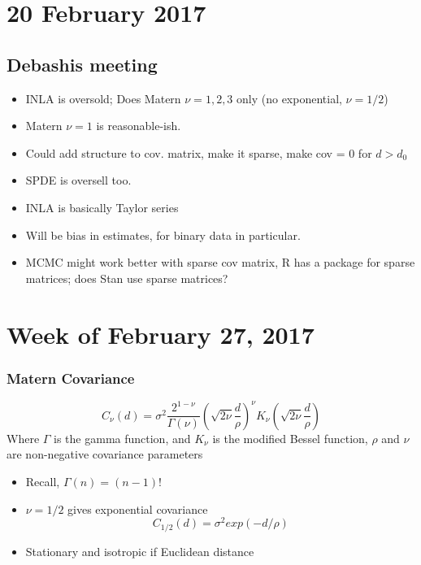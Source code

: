 \documentclass{article}
\begin{document}
\section*{20 February 2017}

\subsection*{Debashis meeting}
\begin{itemize}
\item INLA is oversold; Does Matern $\nu = 1, 2, 3$ only (no exponential, $\nu = 1/2$)
\item Matern $\nu = 1$ is reasonable-ish.
\item Could add structure to cov. matrix, make it sparse, make cov = 0 for $d > d_{0}$
\item SPDE is oversell too.
\item INLA is basically Taylor series
\item Will be bias in estimates, for binary data in particular.
\item MCMC might work better with sparse cov matrix, R has a package for sparse matrices; does Stan use sparse matrices?
\end{itemize}

\section*{Week of February 27, 2017}

\subsubsection*{Matern Covariance}
$$ C_{\nu}(d) = \sigma^{2} \frac{2^{1 - \nu}}{\Gamma(\nu)} \left( \sqrt{2 \nu} \frac{d}{\rho} \right)^{\nu} K_{\nu} \left( \sqrt{2\nu}\frac{d}{\rho} \right) $$
Where $\Gamma$ is the gamma function, and $K_{\nu}$ is the modified Bessel function, $\rho$ and $\nu$ are non-negative covariance parameters
\begin{itemize}
\item Recall, $\Gamma(n) = (n-1)!$
\item $\nu = 1/2$ gives exponential covariance 
$$C_{1/2}(d) = \sigma^{2} exp(-d/\rho)$$
\item Stationary and isotropic if Euclidean distance
\end{itemize}
\end{document}
